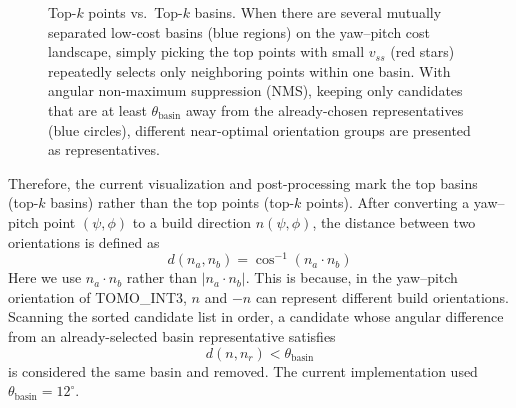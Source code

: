 \documentclass[11pt,a4paper]{article}
\begin{document}
\begin{figure}[H]
\centering
{}
\caption{Top-$k$ points vs.\ Top-$k$ basins. When there are several mutually separated low-cost basins (blue regions) on the
yaw--pitch cost landscape, simply picking the top points with small $v_{ss}$ (red stars) repeatedly selects only neighboring points
within one basin. With angular non-maximum suppression (NMS), keeping only candidates that are at least $\theta_{\mathrm{basin}}$
away from the already-chosen representatives (blue circles), different near-optimal orientation groups are presented as representatives.}
\label{fig:basin-nms}
\end{figure}

Therefore, the current visualization and post-processing mark the top basins (top-$k$ basins) rather than the top points (top-$k$ points).
After converting a yaw--pitch point $(\psi,\phi)$ to a build direction $n(\psi,\phi)$,
the distance between two orientations is defined as
\begin{equation}
d(n_a,n_b)
=
\cos^{-1}(n_a\cdot n_b)
\end{equation}
Here we use $n_a\cdot n_b$ rather than $|n_a\cdot n_b|$.
This is because, in the yaw--pitch orientation of TOMO\_INT3, $n$ and $-n$ can represent different build orientations.
Scanning the sorted candidate list in order,
a candidate whose angular difference from an already-selected basin representative satisfies
\begin{equation}
d(n,n_r) < \theta_{\mathrm{basin}}
\end{equation}
is considered the same basin and removed.
The current implementation used $\theta_{\mathrm{basin}}=12^\circ$.
\end{document}
